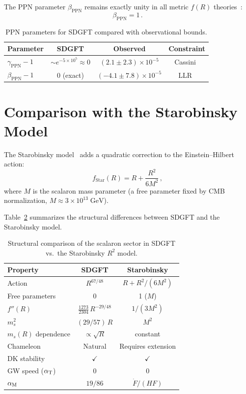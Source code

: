 \documentclass[amsmath,amssymb,aps,prd,twocolumn,superscriptaddress,nofootinbib]{revtex4-2}
\begin{document}
The PPN parameter $\beta_{\mathrm{PPN}}$ remains exactly unity
in all metric $f(R)$ theories~\cite{Olmo2005}:
\begin{equation}
  \beta_{\mathrm{PPN}} = 1\,.
  \label{eq:beta_PPN}
\end{equation}

\begin{table}[t]
\centering
\caption{PPN parameters for SDGFT compared with observational
bounds.}
\label{tab:PPN}
\begin{tabular}{@{}lccc@{}}
\toprule
Parameter & SDGFT & Observed & Constraint \\
\midrule
$\gamma_{\mathrm{PPN}} - 1$
  & $\sim e^{-5 \times 10^5} \approx 0$
  & $(2.1 \pm 2.3) \times 10^{-5}$
  & Cassini~\cite{Bertotti2003} \\
$\beta_{\mathrm{PPN}} - 1$
  & $0$ (exact)
  & $(-4.1 \pm 7.8) \times 10^{-5}$
  & LLR~\cite{Williams2004} \\
\bottomrule
\end{tabular}
\end{table}

\section{Comparison with the Starobinsky Model}
\label{sec:starobinsky}

The Starobinsky model~\cite{Starobinsky1980} adds a quadratic
correction to the Einstein--Hilbert action:
\begin{equation}
  f_{\mathrm{Star}}(R) = R + \frac{R^2}{6M^2}\,,
  \label{eq:starobinsky_action}
\end{equation}
where $M$ is the scalaron mass parameter (a free parameter fixed
by CMB normalization, $M \approx 3 \times 10^{13}\;\mathrm{GeV}$).

Table~\ref{tab:comparison} summarizes the structural differences
between SDGFT and the Starobinsky model.

\begin{table}[t]
\centering
\caption{Structural comparison of the scalaron sector in SDGFT
vs.\ the Starobinsky $R^2$ model.}
\label{tab:comparison}
\begin{tabular}{@{}lcc@{}}
\toprule
Property & SDGFT & Starobinsky \\
\midrule
Action & $R^{67/48}$ & $R + R^2/(6M^2)$ \\
Free parameters & 0 & 1 ($M$) \\
$f''(R)$ & $\tfrac{1273}{2304}\,R^{-29/48}$ & $1/(3M^2)$ \\
$m_s^2$ & $(29/57)\,R$ & $M^2$ \\
$m_s(R)$ dependence & $\propto \sqrt{R}$ & constant \\
Chameleon & Natural & Requires extension \\
DK stability & $\checkmark$ & $\checkmark$ \\
GW speed ($\alpha_{\mathrm{T}}$) & $0$ & $0$ \\
$\alpha_{\mathrm{M}}$ & $19/86$ & $\dot{F}/(HF)$ \\
\bottomrule
\end{tabular}
\end{table}
\end{document}
